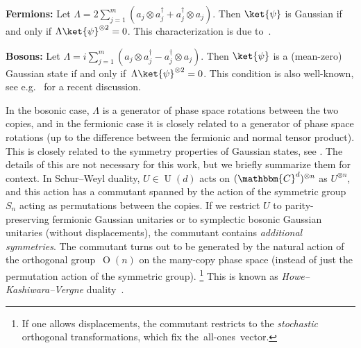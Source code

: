 \documentclass[11pt,a4paper]{article}
\numberwithin{equation}{section}
\newcommand{\ot}{\otimes}
\newcommand{\CC}{\mathbbm{C}}
\newcommand{\1}{\mathbf{1}}
\DeclareMathOperator{\Ortho}{O}
\DeclareMathOperator{\U}{U}
\begin{document}
\begin{description}
\item \textbf{Fermions:}
Let $\Lambda = 2 \sum_{j=1}^m \left(a_j \ot a_j^\dagger + a_j^\dagger \ot a_j\right)$.
Then $\ket{\psi}$ is Gaussian if and only if $\Lambda \ket{\psi}^{\ot 2} = 0$.
This characterization is due to~\cite{bravyi2005lagrangian,melo2013power}.

\item \textbf{Bosons:}
Let $\Lambda = i\sum_{j=1}^m \left(a_j \ot a_j^\dagger - a_j^\dagger \ot a_j\right)$.
Then $\ket{\psi}$ is a (mean-zero) Gaussian state if and only if~$\Lambda \ket{\psi}^{\ot 2} = 0$. This condition is also well-known, see e.g.~\cite{girardi2025gaussian} for a recent discussion.
\end{description}

\noindent
In the bosonic case, $\Lambda$ is a generator of phase space rotations between the two copies, and in the fermionic case it is closely related to a generator of phase space rotations (up to the difference between the fermionic and normal tensor product).
This is closely related to the symmetry properties of Gaussian states, see \cite{girardi2025gaussian,chen2026optimal}.
The details of this are not necessary for this work, but we briefly summarize them for context.
In Schur--Weyl duality, $U \in \U(d)$ acts on $(\CC^d)^{\ot n}$ as $U^{\ot n}$, and this action has a commutant spanned by the action of the symmetric group $S_n$ acting as permutations between the copies.
If we restrict $U$ to parity-preserving fermionic Gaussian unitaries or to symplectic bosonic Gaussian unitaries (without displacements), the commutant contains \emph{additional symmetries}.
The commutant turns out to be generated by the natural action of the orthogonal group~$\Ortho(n)$ on the many-copy phase space (instead of just the permutation action of the symmetric group).%
\footnote{If one allows displacements, the commutant restricts to the \emph{stochastic} orthogonal transformations, which fix the~all-ones~vector.}
This is known as \emph{Howe--Kashiwara--Vergne} duality~\cite{howe1989remarks,kashiwara1978segal}.
\end{document}
